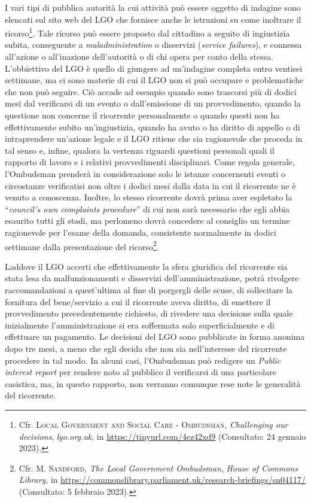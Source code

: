 \documentclass[12pt,it,a4paper,]{report}
\begin{document}
I vari tipi di pubblica autorità la cui attività può essere oggetto di
indagine sono elencati sul sito web del LGO che fornisce anche le
istruzioni su come inoltrare il ricorso\footnote{Cfr. \textsc{Local
  Government and Social Care - Ombudsman}, \emph{Challenging our
  decisions}, \emph{lgo.org.uk}, in \url{https://tinyurl.com/4ez42xd9}
  (Consultato: 24 gennaio 2023).}. Tale ricorso può essere proposto dal
cittadino a seguito di ingiustizia subita, conseguente a
\emph{maladministration} o disservizi (\emph{service failures}), e
connessa all'azione o all'inazione dell'autorità o di chi opera per
conto della stessa. L'obbiettivo del LGO è quello di giungere ad
un'indagine completa entro ventisei settimane, ma ci sono materie di cui
il LGO non si può occupare e problematiche che non può seguire. Ciò
accade ad esempio quando sono trascorsi più di dodici mesi dal
verificarsi di un evento o dall'emissione di un provvedimento, quando la
questione non concerne il ricorrente personalmente o quando questi non
ha effettivamente subito un'ingiustizia, quando ha avuto o ha diritto di
appello o di intraprendere un'azione legale e il LGO ritiene che sia
ragionevole che proceda in tal senso e, infine, qualora la vertenza
riguardi questioni personali quali il rapporto di lavoro e i relativi
provvedimenti disciplinari. Come regola generale, l'Ombudsman prenderà
in considerazione solo le istanze concernenti eventi o circostanze
verificatisi non oltre i dodici mesi dalla data in cui il ricorrente ne
è venuto a conoscenza. Inoltre, lo stesso ricorrente dovrà prima aver
espletato la ``\emph{council's own complaints procedure}'' di cui non
sarà necessario che egli abbia esaurito tutti gli stadi, ma perlomeno
dovrà concedere al consiglio un termine ragionevole per l'esame della
domanda, consistente normalmente in dodici settimane dalla presentazione
del ricorso\footnote{Cfr. M. \textsc{Sandford}, \emph{The Local
  Government Ombudsman}, \emph{House of Commons Library}, in
  \url{https://commonslibrary.parliament.uk/research-briefings/sn04117/}
  (Consultato: 5 febbraio 2023).}.

Laddove il LGO accerti che effettivamente la sfera giuridica del
ricorrente sia stata lesa da malfunzionamenti e disservizi
dell'amministrazione, potrà rivolgere raccomandazioni a quest'ultima al
fine di porgergli delle scuse, di sollecitare la fornitura del
bene/servizio a cui il ricorrente aveva diritto, di emettere il
provvedimento precedentemente richiesto, di rivedere una decisione sulla
quale inizialmente l'amministrazione si era soffermata solo
superficialmente e di effettuare un pagamento. Le decisioni del LGO sono
pubblicate in forma anonima dopo tre mesi, a meno che egli decida che
non sia nell'interesse del ricorrente procedere in tal modo. In alcuni
casi, l'Ombudsman può redigere un \emph{Public interest report} per
rendere noto al pubblico il verificarsi di una particolare casistica,
ma, in questo rapporto, non verranno comunque rese note le generalità
del ricorrente.
\end{document}
